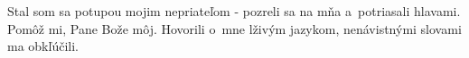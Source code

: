 Stal som sa potupou mojim nepriateľom - pozreli sa na mňa a~potriasali hlavami.
\versseparator 
Pomôž mi, Pane Bože môj.
\versseparator 
Hovorili o~mne lživým jazykom, nenávistnými slovami ma obkľúčili.
